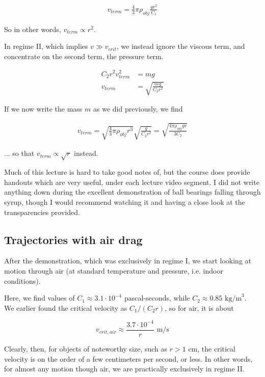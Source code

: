 \begin{align}
v_{term} = \frac{4}{3} \pi \rho_{obj} \frac{g r^2}{C_1}
\end{align}

So in other words, $v_{term} \propto r^2$.

In regime II, which implies $v \gg v_{crit}$, we instead ignore the viscous term, and concentrate on the second term, the pressure term.

\begin{align}
C_2 r^2 v_{term}^2 &= m g\\
v_{term} &= \sqrt{\frac{m g}{C_2 r^2}}
\end{align}

If we now write the mass $m$ as we did previously, we find

\begin{align}
v_{term} = \sqrt{\frac{4}{3} \pi \rho_{obj} r^3} \sqrt{\frac{ g}{C_2 r^2}} = \sqrt{\frac{4\pi \rho_{obj} g r}{3 C_2}}
\end{align}

... so that $v_{term} \propto \sqrt{r}$ instead.

Much of this lecture is hard to take good notes of, but the course does provide handouts which are very useful, under each lecture video segment. I did not write anything down during the excellent demonstration of ball bearings falling through syrup, though I would recommend watching it and having a close look at the transparencies provided.

\subsection{Trajectories with air drag}

After the demonstration, which was exclusively in regime I, we start looking at motion through air (at standard temperature and pressure, i.e. indoor conditions).

Here, we find values of $C_1 \approx 3.1 \cdot 10^{-4}$ pascal-seconds, while $C_2 \approx 0.85 \text{ kg/m}^3$.\\
We earlier found the critical velocity as $C_1/(C_2 r)$, so for air, it is about 

\begin{equation}
v_{crit,air} \approx \frac{3.7 \cdot 10^{-4}}{r} \text{ m/s}
\end{equation}

Clearly, then, for objects of noteworthy size, such as $r > 1$ cm, the critical velocity is on the order of a few centimeters per second, or less. In other words, for almost any motion though air, we are practically exclusively in regime II.

